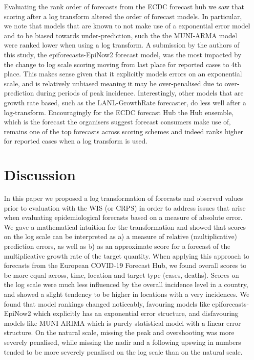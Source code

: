 \documentclass{article}
\begin{document}
Evaluating the rank order of forecasts from the ECDC forecast hub we saw that scoring after a log transform altered the order of forecast models. In particular, we note that models that are known to not make use of a exponential error model and to be biased towards under-prediction, such the the MUNI-ARMA model were ranked lower when using a log transform. A submission by the authors of this study, the epiforecasts-EpiNow2 forecast model, was the most impacted by the change to log scale scoring moving from last place for reported cases to 4th place. This makes sense given that it explicitly models errors on an exponential scale, and is relatively unbiased meaning it may be over-penalised due to over-prediction during periods of peak incidence. Interestingly, other models that are growth rate based, such as the LANL-GrowthRate forecaster, do less well after a log-transform. Encouragingly for the ECDC forecast Hub the Hub ensemble, which is the forecast the organisers suggest forecast consumers make use of, remains one of the top forecasts across scoring schemes and indeed ranks higher for reported cases when a log transform is used.




\section{Discussion}
\label{sec:discussion}

In this paper we proposed a log transformation of forecasts and observed values prior to evaluation with the WIS (or CRPS) in order to address issues that arise when evaluating epidemiological forecasts based on a measure of absolute error. We gave a mathematical intuition for the transformation and showed that scores on the log scale can be interpreted as a) a measure of relative (multiplicative) prediction errors, as well as b) as an approximate score for a forecast of the multiplicative growth rate of the target quantity. 
When applying this approach to forecasts from the European COVID-19 Forecast Hub, we found overall scores to be more equal across, time, location and target type (cases, deaths). Scores on the log scale were much less influenced by the overall incidence level in a country, and showed a slight tendency to be higher in locations with a very incidences. We found that model rankings changed noticeably, favouring models like epiforecasts-EpiNow2 which explicitly has an exponential error structure, and disfavouring models like MUNI-ARIMA which is purely statistical model with a linear error structure. On the natural scale, missing the peak and overshooting was more severely penalised, while missing the nadir and a following upswing in numbers tended to be more severely penalised on the log scale than on the natural scale. 
\end{document}
